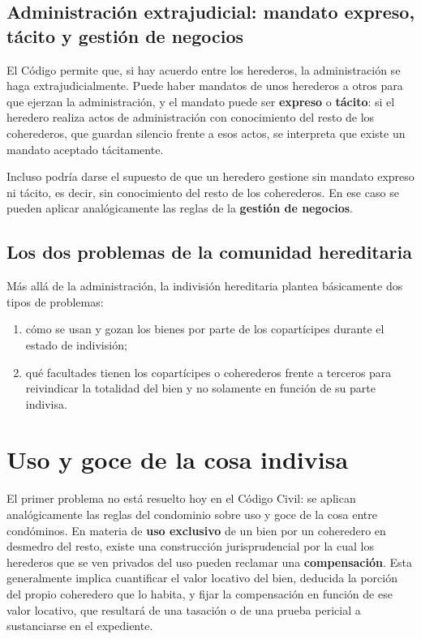 \documentclass[12pt,oneside]{book}
\begin{document}
\subsection{Administración extrajudicial: mandato expreso, tácito y gestión de negocios}

El Código permite que, si hay acuerdo entre los herederos, la administración se haga extrajudicialmente. Puede haber mandatos de unos herederos a otros para que ejerzan la administración, y el mandato puede ser \textbf{expreso} o \textbf{tácito}: si el heredero realiza actos de administración con conocimiento del resto de los coherederos, que guardan silencio frente a esos actos, se interpreta que existe un mandato aceptado tácitamente.

Incluso podría darse el supuesto de que un heredero gestione sin mandato expreso ni tácito, es decir, sin conocimiento del resto de los coherederos. En ese caso se pueden aplicar analógicamente las reglas de la \textbf{gestión de negocios}.

\subsection{Los dos problemas de la comunidad hereditaria}

Más allá de la administración, la indivisión hereditaria plantea básicamente dos tipos de problemas:

\begin{enumerate}
    \item cómo se usan y gozan los bienes por parte de los copartícipes durante el estado de indivisión;
    \item qué facultades tienen los copartícipes o coherederos frente a terceros para reivindicar la totalidad del bien y no solamente en función de su parte indivisa.
\end{enumerate}

\section{Uso y goce de la cosa indivisa}

El primer problema no está resuelto hoy en el Código Civil: se aplican analógicamente las reglas del condominio sobre uso y goce de la cosa entre condóminos. En materia de \textbf{uso exclusivo} de un bien por un coheredero en desmedro del resto, existe una construcción jurisprudencial por la cual los herederos que se ven privados del uso pueden reclamar una \textbf{compensación}. Esta generalmente implica cuantificar el valor locativo del bien, deducida la porción del propio coheredero que lo habita, y fijar la compensación en función de ese valor locativo, que resultará de una tasación o de una prueba pericial a sustanciarse en el expediente.
\end{document}
